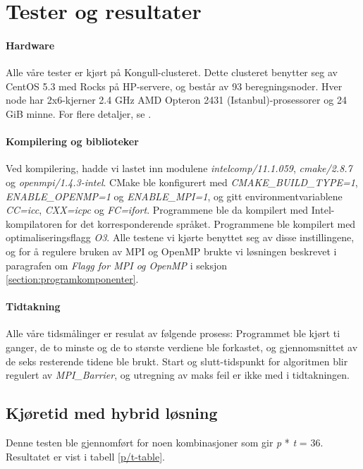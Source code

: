 \documentclass{article}
\begin{document}
\section{Tester og resultater}

\paragraph{Hardware}
Alle våre tester er kjørt på Kongull-clusteret. Dette clusteret benytter seg av CentOS 5.3 med Rocks på HP-servere, og består av 93 beregningsnoder. Hver node har 2x6-kjerner 2.4 GHz AMD Opteron 2431 (Istanbul)-prosessorer og 24 GiB minne. For flere detaljer, se \cite{kongull-hardware}.  

\paragraph{Kompilering og biblioteker}
Ved kompilering, hadde vi lastet inn modulene \emph{intelcomp/11.1.059}, \emph{cmake/2.8.7} og \emph{openmpi/1.4.3-intel}. CMake ble konfigurert med \emph{CMAKE\_BUILD\_TYPE=1}, \emph{ENABLE\_OPENMP=1} og \emph{ENABLE\_MPI=1}, og gitt environmentvariablene \emph{CC=icc}, \emph{CXX=icpc} og \emph{FC=ifort}. Programmene ble da kompilert med Intel-kompilatoren for det korresponderende språket. Programmene ble kompilert med optimaliseringsflagg \emph{O3}. Alle testene vi kjørte benyttet seg av disse instillingene, og for å regulere bruken av MPI og OpenMP brukte vi løsningen beskrevet i paragrafen om \emph{Flagg for MPI og OpenMP} i seksjon \ref{section:programkomponenter}.

\paragraph{Tidtakning}
Alle våre tidsmålinger er resulat av følgende prosess: Programmet ble kjørt ti ganger, de to minste og de to største verdiene ble forkastet, og gjennomsnittet av de seks resterende tidene ble brukt. Start og slutt-tidspunkt for algoritmen blir regulert av \emph{MPI\_Barrier}, og utregning av maks feil er ikke med i tidtakningen.



\subsection{Kjøretid med hybrid løsning}
\label{subsection:runtime}
Denne testen ble gjennomført for noen kombinasjoner som gir \emph{p} * \emph{t} = 36. Resultatet er vist i tabell \ref{p/t-table}.
\end{document}
